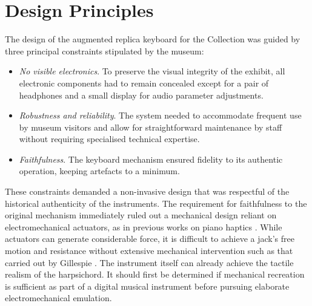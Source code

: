 \section{Design Principles}\label{design}

The design of the augmented replica keyboard for the  Collection was guided by three principal constraints stipulated by the museum:
\begin{itemize}
\item \emph{No visible electronics}. To preserve the visual integrity of the exhibit, all electronic components had to remain concealed except for a pair of headphones and a small display for audio parameter adjustments.
\item \emph{Robustness and reliability}. The system needed to accommodate frequent use by museum visitors and allow for straightforward maintenance by staff without requiring specialised technical expertise.
\item \emph{Faithfulness}. The keyboard mechanism ensured fidelity to its authentic operation, keeping artefacts to a minimum. 
\end{itemize}

These constraints demanded a non-invasive design that was respectful of the historical authenticity of the instruments. The requirement for faithfulness to the original mechanism immediately ruled out a mechanical design reliant on electromechanical actuators, as in previous works on piano haptics \cite{Timmermans2020,Gillespie1996}. 
While actuators can generate considerable force, it is difficult to achieve a jack's free motion and resistance without extensive mechanical intervention such as that carried out by Gillespie \cite{Gillespie1996}. The instrument itself can already achieve the tactile realism of the harpsichord. 
It should first be determined if mechanical recreation is sufficient as part of a digital musical instrument before pursuing elaborate electromechanical emulation. 

